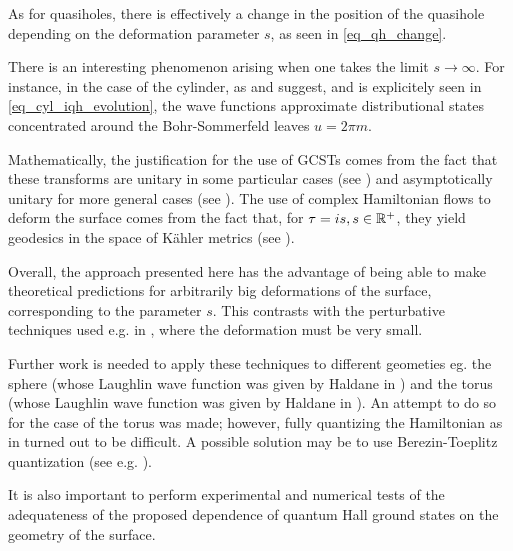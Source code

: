 \documentclass[notas.tex]{subfiles}
\begin{document}
As for quasiholes, there is effectively a change in the position of the quasihole depending on the deformation parameter $s$, as seen in \eqref{eq_qh_change}. 


There is an interesting phenomenon arising when one takes the limit $s \to \infty$. For instance, in the case of the cylinder, as  and  suggest, and is explicitely seen in \eqref{eq_cyl_iqh_evolution}, the wave functions approximate distributional states concentrated around the Bohr-Sommerfeld leaves $u = 2 \pi m$. 

Mathematically, the justification for the use of GCSTs comes from the fact that these transforms are unitary in some particular cases (see \cite{kirwin_complex_2013}) and asymptotically unitary for more general cases (see ). The use of complex Hamiltonian flows to deform the surface comes from the fact that, for $\tau = is, s \in \mathbb{R}^+$, they yield geodesics in the space of Kähler metrics (see ).

Overall, the approach presented here has the advantage of being able to make theoretical predictions for arbitrarily big deformations of the surface, corresponding to the parameter $s$. This contrasts with the perturbative techniques used e.g. in \cite{johri_probing_2016}, where the deformation must be very small. 

Further work is needed to apply these techniques to different geometies eg. the sphere (whose Laughlin wave function was given by Haldane in \cite{haldane_fractional_1983}) and the torus (whose Laughlin wave function was given by Haldane in \cite{haldane_periodic_1985}). An attempt to do so for the case of the torus was made; however, fully quantizing the Hamiltonian as in  turned out to be difficult. A possible solution may be to use Berezin-Toeplitz quantization (see e.g. \cite{englis_excursion_2016}).

It is also important to perform experimental and numerical tests of the adequateness of the proposed dependence of quantum Hall ground states on the geometry of the surface.
\end{document}
